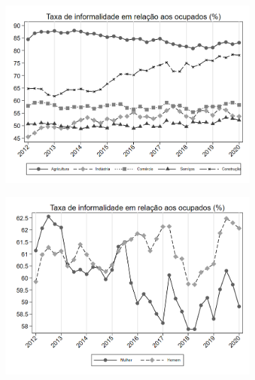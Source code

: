 \documentclass[11pt]{beamer}
\begin{document}
\begin{frame}
\begin{figure}[h!tpb]
\centering
\begin{subfigure}{.5\textwidth}
  \centering
  \includegraphics[width=.95\linewidth]{../../analysis/output/composicao_demografica/setor/_composicao_demografica_setor_taxa_de_informalidade.png}
  \label{fig:_composicao_demografica_setor_taxa_de_informalidade}
\end{subfigure}%
\begin{subfigure}{.5\textwidth}
  \centering
  \includegraphics[width=.95\linewidth]{../../analysis/output/composicao_demografica/genero/_composicao_demografica_genero_taxa_de_informalidade.png}
  \label{fig:_composicao_demografica_genero_taxa_de_informalidade}
\end{subfigure}


\end{figure}
\end{frame}
\end{document}
